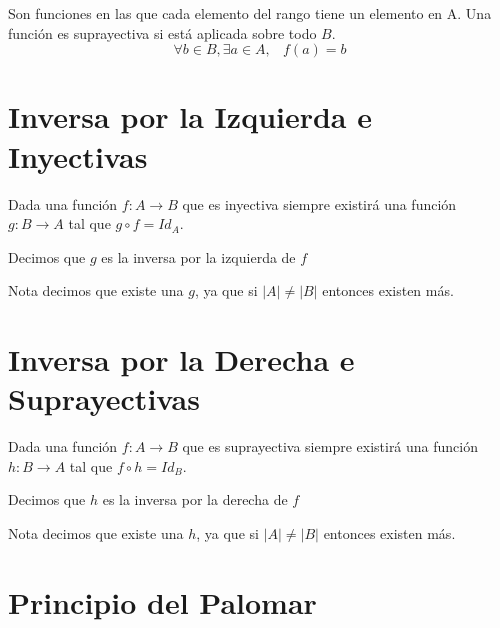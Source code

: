 \documentclass[12pt, fleqn]{report}                             %
\DeclareMathOperator \Space     {\quad}                         %
\DeclareMathOperator \MiniSpace {\;}                            %
\theoremstyle{break}                                            %
\begin{document}
                Son funciones en las que cada elemento del rango tiene un elemento en A.
                Una función es suprayectiva si está aplicada sobre todo $B$.
                \begin{equation*}
                    \forall b \in B, \exists a \in A, \MiniSpace f(a) = b
                \end{equation*}


        \section{Inversa por la Izquierda e Inyectivas}

            Dada una función $f: A \to B$ que es inyectiva siempre existirá una función
            $g: B \to A$ tal que $g \circ f = Id_A$.

            Decimos que $g$ es la inversa por la izquierda de $f$

            Nota decimos que existe una $g$, ya que si $|A| \neq |B|$ entonces existen más.


        \section{Inversa por la Derecha e Suprayectivas}

            Dada una función $f: A \to B$ que es suprayectiva siempre existirá una función
            $h: B \to A$ tal que $f \circ h = Id_B$.

            Decimos que $h$ es la inversa por la derecha de $f$

            Nota decimos que existe una $h$, ya que si $|A| \neq |B|$ entonces existen más.





        \clearpage
        \section{Principio del Palomar}
\end{document}
